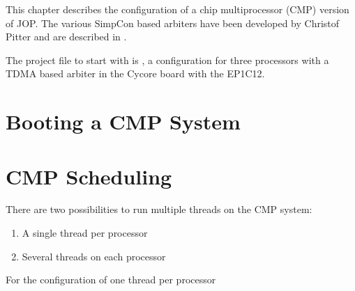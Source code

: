 This chapter describes the configuration of a chip multiprocessor
(CMP) version of JOP. The various SimpCon based arbiters have been
developed by Christof Pitter and are described in \cite{jop:dma,
jop:cmp, jop:cmp:eval}.

The project file to start with is , a configuration for
three processors with a TDMA based arbiter in the Cycore board with
the EP1C12.

\section{Booting a CMP System}

\section{CMP Scheduling}

There are two possibilities to run multiple threads on the CMP
system:

\begin{enumerate}
  \item A single thread per processor
  \item Several threads on each processor
\end{enumerate}

For the configuration of one thread per processor
